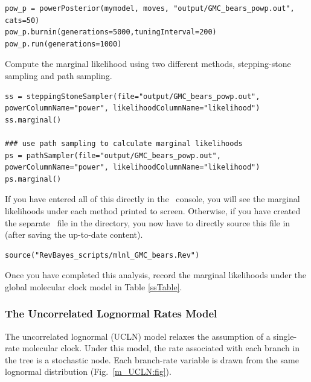 {\tt \begin{snugshade*}
\begin{lstlisting}
pow_p = powerPosterior(mymodel, moves, "output/GMC_bears_powp.out", cats=50) 
pow_p.burnin(generations=5000,tuningInterval=200)
pow_p.run(generations=1000)  
\end{lstlisting}
\end{snugshade*}}

Compute the marginal likelihood using two different methods, stepping-stone sampling and path sampling. 
{\tt \begin{snugshade*}
\begin{lstlisting}
ss = steppingStoneSampler(file="output/GMC_bears_powp.out", powerColumnName="power", likelihoodColumnName="likelihood")
ss.marginal() 

### use path sampling to calculate marginal likelihoods
ps = pathSampler(file="output/GMC_bears_powp.out", powerColumnName="power", likelihoodColumnName="likelihood")
ps.marginal() 
\end{lstlisting}
\end{snugshade*}}

If you have entered all of this directly in the \RevBayes~console, you will see the marginal likelihoods under each method printed to screen. 
Otherwise, if you have created the separate \Rev~file 
{\textcolor{red}{}} in the  directory, you now have to directly source this file in \RevBayes (after saving the up-to-date content). 

{\tt \begin{snugshade*}
\begin{lstlisting}
source("RevBayes_scripts/mlnl_GMC_bears.Rev")
\end{lstlisting}
\end{snugshade*}}

{\begin{framed}
Once you have completed this analysis, record the marginal likelihoods under the global molecular clock model in Table \ref{ssTable}.
\end{framed}}

\bigskip
\subsubsection{The Uncorrelated Lognormal Rates Model}\label{UCLNModelSec}

The uncorrelated lognormal (UCLN) model relaxes the assumption of a single-rate molecular clock. 
Under this model, the rate associated with each branch in the tree is a stochastic node.
Each branch-rate variable is drawn from the same lognormal distribution (Fig.~\ref{m_UCLN:fig}).


